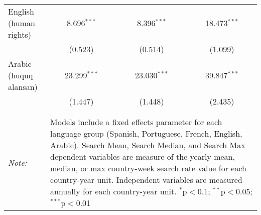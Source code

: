 \begin{table}[!htbp]
\begin{tabular}{@{\extracolsep{5pt}}lccc}
  English (human rights) & 8.696$^{***}$ & 8.396$^{***}$ & 18.473$^{***}$ \\ 
  & (0.523) & (0.514) & (1.099) \\ 
  Arabic (huquq alansan) & 23.299$^{***}$ & 23.030$^{***}$ & 39.847$^{***}$ \\ 
  & (1.447) & (1.448) & (2.435) \\ 
 \hline \\[-1.8ex] 
\hline 
\hline \\[-1.8ex] 
\textit{Note:}  & \multicolumn{3}{l}{\parbox[t]{8cm}{Models include a fixed effects parameter for each language group (Spanish, Portuguese, French, English, Arabic). Search Mean, Search Median, and Search Max dependent variables are measure of the yearly mean, median, or max country-week search rate value for each country-year unit. Independent variables are measured annually for each country-year unit. $^{*}$p$<$0.1; $^{**}$p$<$0.05; $^{***}$p$<$0.01}} \\ 
\end{tabular} 
\end{table} 
